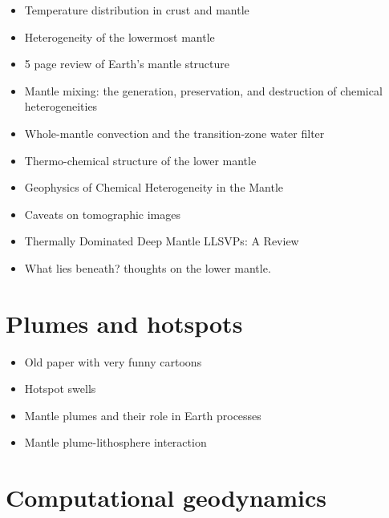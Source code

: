    \begin{itemize}
   \item [\nineteeneightysix] Temperature distribution in crust and mantle \cite{jemo86}
   \item [\twothousand] Heterogeneity of the lowermost mantle \cite{garn00}
   \item [\twothousandone] 5 page review of Earth's mantle structure \cite{hewo01}
   \item [\twothousandtwo] Mantle mixing: the generation, preservation, and destruction of chemical heterogeneities \cite{vahb02}
   \item [\twothousandthree] Whole-mantle convection and the transition-zone water filter \cite{beka03}
   \item [\twothousandseven] Thermo-chemical structure of the lower mantle \cite{dett07}
   \item [\twothousandtwelve] Geophysics of Chemical Heterogeneity in the Mantle \cite{stli12}
   \item [\twothousandthirteen] Caveats on tomographic images \cite{fopa13}
   \item [\twothousandfifteen] Thermally Dominated Deep Mantle LLSVPs: A Review \cite{dagl15}
   \item [\twothousandnineteen] What lies beneath? thoughts on the lower mantle. \cite{hega19}
   \end{itemize}


\section{Plumes and hotspots}

   \begin{itemize}
   \item[\nineteenseventyseven] Old paper with very funny cartoons \cite{hovo77}
   \item[\twothousandfourteen] Hotspot swells \cite{kiad14}
   \item[\twothousandtwentyone] Mantle plumes and their role in Earth processes \cite{kobj21}
   \item[\twothousandtwentysix] Mantle plume-lithosphere interaction \cite{lewl26}
   \end{itemize}


\section{Computational geodynamics}

